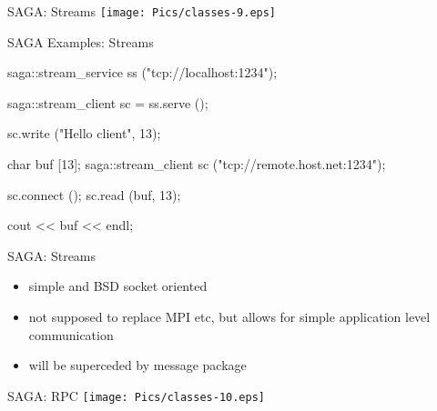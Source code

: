 \documentclass[%
  pdf,
  colorBG,
  slideColor,
  frames,
  ogf
]{prosper}
\newcommand{\dn}{\vspace*{+1em}}
\begin{document}

 \begin{slide}{SAGA: Streams}
   \texttt{[image: Pics/classes-9.eps]}
 \end{slide}


 \begin{slide}{SAGA Examples: Streams}

  \begin{mycode}[label=stream server]
  saga::stream_service ss ("tcp://localhost:1234");

  saga::stream_client sc = ss.serve ();

  sc.write ("Hello client", 13);

  \end{mycode}

  \dn

  \begin{mycode}[label=stream client]
  char buf [13];
  saga::stream_client sc ("tcp://remote.host.net:1234");

  sc.connect ();
  sc.read    (buf, 13);

  cout << buf << endl;
  \end{mycode}
   
 \end{slide}


 \begin{slide}{SAGA: Streams}

 \dn 

  \begin{itemize}
   \item simple and BSD socket oriented
   \item not supposed to replace MPI etc, but allows for simple application
   level communication
   \item will be superceded by message package
  \end{itemize}

 \end{slide}


 \begin{slide}{SAGA: RPC}
   \texttt{[image: Pics/classes-10.eps]}
 \end{slide}
\end{document}
